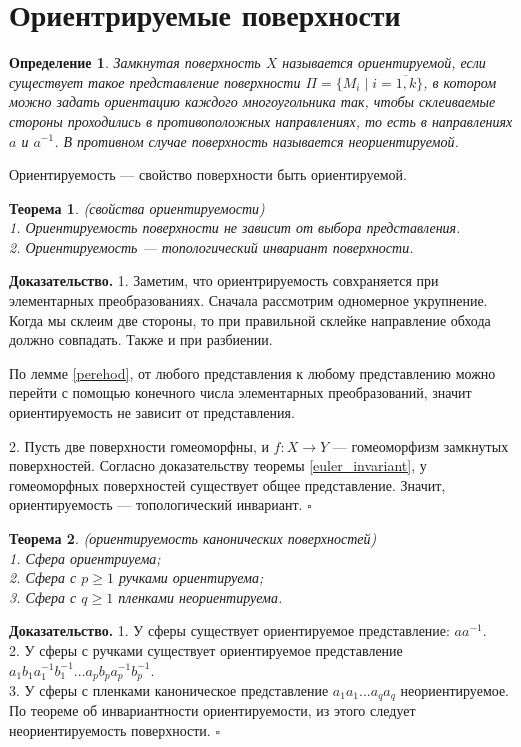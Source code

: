 \documentclass[a4paper]{article}
\newtheorem{defin}{Определение}
\newtheorem{theor}{Теорема}
\begin{document}
\section{Ориентрируемые поверхности}
\begin{defin}
Замкнутая поверхность $X$ называется ориентируемой, если
существует такое представление поверхности  
$\Pi = \{M_i\mid i = \overline{1,k}\}$, в котором можно задать ориентацию 
каждого многоугольника так, чтобы склеиваемые стороны проходились в 
противоположных направлениях, то есть в направлениях $a$ и  $a^{-1}$. В 
противном случае поверхность называется неориентируемой. 
\end{defin}
Ориентируемость --- свойство поверхности быть ориентируемой.
\begin{theor} (свойства ориентируемости)\\
1. Ориентируемость поверхности не зависит от выбора представления.\\
2. Ориентируемость --- топологический инвариант поверхности.
\end{theor}
\textbf{Доказательство.}  
1. Заметим, что ориентрируемость совхраняется при элементарных 
преобразованиях. Сначала рассмотрим одномерное укрупнение. 
Когда мы склеим две стороны, то при правильной склейке направление обхода
должно совпадать. Также и при разбиении.

По лемме \ref{perehod}, от любого представления к любому представлению 
можно перейти с помощью конечного числа элементарных преобразований, значит 
ориентируемость не зависит от представления. 

2. Пусть две поверхности гомеоморфны, и $f\colon X\to Y$ ---
гомеоморфизм замкнутых поверхностей. Согласно доказательству теоремы
\ref{euler_invariant}, у гомеоморфных поверхностей существует общее
представление. Значит, ориентируемость --- топологический инвариант.
$\square$ 
\begin{theor} (ориентируемость канонических поверхностей)\\
1. Сфера ориентриуема;\\
2. Сфера с $p\geqslant 1$ ручками ориентируема;\\
3. Сфера с $q\geqslant 1$ пленками неориентируема.\\
\end{theor}
\textbf{Доказательство.}  
1. У сферы существует ориентируемое представление:
$aa^{-1}$.\\
2. У сферы с ручками существует ориентируемое представление\\
$a_1b_1a_1^{-1}b_1^{-1}...a_pb_pa_p^{-1}b_p^{-1}$.\\
3. У сферы с пленками каноническое представление  
$a_1a_1...a_qa_q$ неориентируемое. По теореме об инвариантности 
ориентируемости, из этого следует неориентируемость поверхности.
$\square$ 
\end{document}
